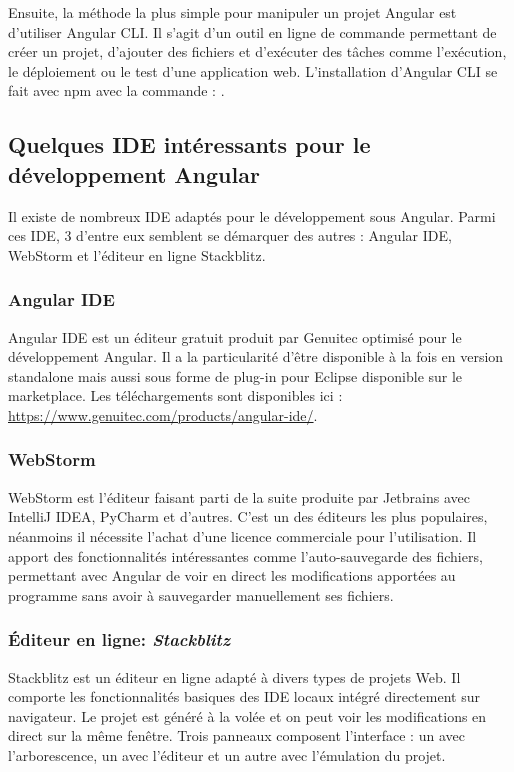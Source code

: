 \documentclass{polytech/polytech}
\begin{document}
Ensuite, la méthode la plus simple pour manipuler un projet Angular est d’utiliser Angular CLI. Il s’agit d’un outil en ligne de commande permettant de créer un projet, d’ajouter des fichiers et d’exécuter des tâches comme l’exécution, le déploiement ou le test d’une application web. L’installation d’Angular CLI se fait avec npm avec la commande : .

\subsection{Quelques IDE intéressants pour le développement Angular}

Il existe de nombreux IDE adaptés pour le développement sous Angular. Parmi ces IDE, 3 d’entre eux semblent se démarquer des autres : Angular IDE, WebStorm et l’éditeur en ligne Stackblitz.

\subsubsection{Angular IDE}

Angular IDE est un éditeur gratuit produit par Genuitec optimisé pour le développement Angular. Il a la particularité d’être disponible à la fois en version standalone mais aussi sous forme de plug-in pour Eclipse disponible sur le marketplace. Les téléchargements sont disponibles ici : \url{https://www.genuitec.com/products/angular-ide/}. 

\subsubsection{WebStorm}

WebStorm est l’éditeur faisant parti de la suite produite par Jetbrains avec IntelliJ IDEA, PyCharm et d’autres. C’est un des éditeurs les plus populaires, néanmoins il nécessite l’achat d’une licence commerciale pour l’utilisation. Il apport des fonctionnalités intéressantes comme l’auto-sauvegarde des fichiers, permettant avec Angular de voir en direct les modifications apportées au programme sans avoir à sauvegarder manuellement ses fichiers. 

\subsubsection{Éditeur en ligne: \textit{Stackblitz}}

Stackblitz est un éditeur en ligne adapté à divers types de projets Web. Il comporte les fonctionnalités basiques des IDE locaux intégré directement sur navigateur. Le projet est généré à la volée et on peut voir les modifications en direct sur la même fenêtre. Trois panneaux composent l’interface : un avec l’arborescence, un avec l’éditeur et un autre avec l’émulation du projet. 
\end{document}

